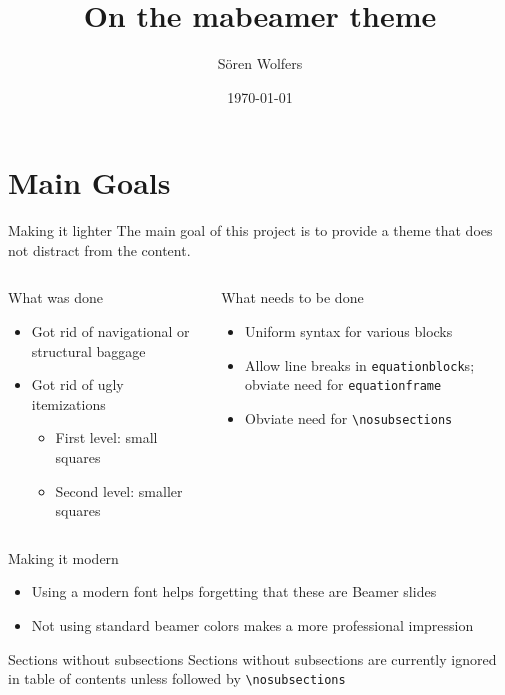 \documentclass{beamer}
\title{On the mabeamer theme}
\date{\today}
\author{Sören Wolfers}
\begin{document}
\matitle

\section{Main Goals}
\nosubsections

\begin{frame}{Making it lighter}
The main goal of this project is to provide a theme that does not distract from the content.
\begin{columns}
	\begin{column}{0.5\textwidth}	
		\begin{block}{What  was done}
		\begin{itemize}
		\item Got rid of navigational or structural baggage
		\item Got rid of ugly itemizations%
		\begin{itemize}
		\item First level: small squares
		\item Second level: smaller squares
		\end{itemize}
		\end{itemize}
		\end{block}
	\end{column}
	\begin{column}{0.5\textwidth}
		\begin{block}{What  needs to be done}
		\begin{itemize}
			\item Uniform syntax for various blocks
			\item Allow line breaks in \texttt{equationblock}s; obviate need for \texttt{equationframe}
			\item Obviate need for \texttt{\textbackslash nosubsections}  
		\end{itemize}
		\end{block}
	\end{column}
\end{columns}
\end{frame}

\begin{frame}{Making it modern}
\begin{itemize}
	\item Using a modern font helps forgetting that these are Beamer slides

	\item Not using {\color{yellow}standard} {\color{blue}beamer} {\color{red}colors} makes a more professional impression
\end{itemize}

\begin{block}{Sections without subsections}
Sections without subsections are currently ignored in table of contents unless followed by \texttt{\textbackslash nosubsections}
\end{block}
\end{frame}
\end{document}
